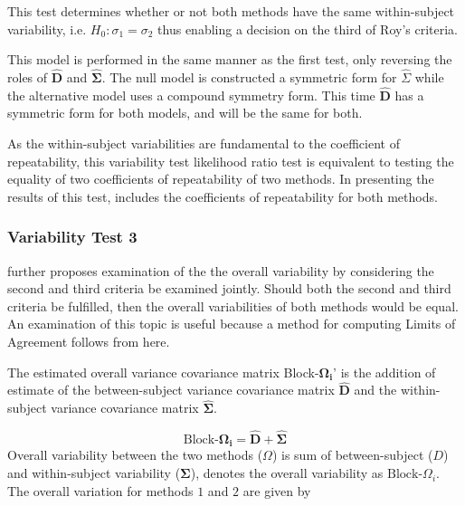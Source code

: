 \documentclass[12pt, a4paper]{report}
\theoremstyle{plain}
\theoremstyle{definition}
\theoremstyle{remark}
\begin{document}
This test determines whether or not both methods have the same within-subject variability, i.e. $H_{0}: \sigma_{1}  = \sigma_{2}$ thus enabling a decision on the third of Roy's criteria.

This model is performed in the same manner as the first test, only reversing the roles of ${\hat{\boldsymbol{D}}}$ and $\boldsymbol{\hat{\Sigma}}$. The null model is constructed a symmetric form for ${\hat{\Sigma}}$ while the alternative model uses a compound symmetry form. This time ${\hat{\boldsymbol{D}}}$ has a symmetric form for both models, and will be the same for both.

As the within-subject variabilities are fundamental to the coefficient of repeatability, this variability test likelihood ratio test is equivalent to testing the equality of two coefficients of repeatability of two methods. In presenting the results of this test, \citet{ARoy2009} includes the coefficients of repeatability for both methods.


\subsubsection{Variability Test 3}
\citet{ARoy2009} further proposes examination of the the overall variability by considering the second and third criteria be examined jointly. Should both the second and third criteria be fulfilled, then the overall variabilities of both methods would be equal. An examination of this topic is useful because a method for computing Limits of Agreement follows from here.

The estimated overall variance covariance matrix Block-$\boldsymbol{\Omega_{i}}$' is the addition of estimate of the between-subject variance covariance matrix ${\hat{\boldsymbol{D}}}$ and the within-subject variance covariance matrix $\boldsymbol{\hat{\Sigma}}$.

\begin{equation}
\mbox{Block-}\boldsymbol{\Omega_{i}} = \boldsymbol{\hat{D}} + \boldsymbol{\hat{\Sigma}}
\end{equation}
Overall variability between the two methods ($\Omega$) is sum of between-subject ($D$) and within-subject variability ($\boldsymbol{\Sigma}$),
\citet{ARoy2009} denotes the overall variability as ${\mbox{Block-} \Omega_{i}}$. The overall variation for methods $1$ and $2$ are given by
\end{document}
